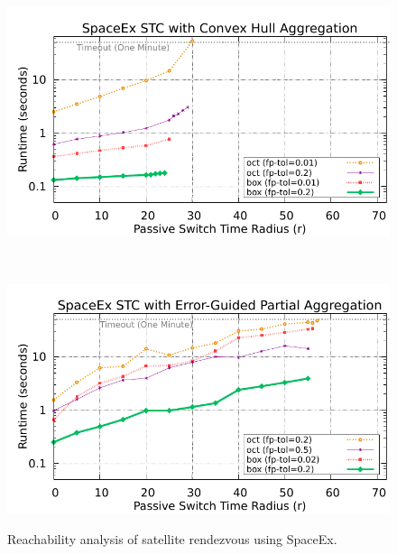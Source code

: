 \begin{figure}
\begin{minipage}{0.48\textwidth}
\begin{minipage}[b]{\linewidth}
\centerline{\includegraphics[width=0.98\columnwidth]{images/chull.pdf}}
\label{fig:spaceex_chull}
\end{minipage}
\\
\begin{minipage}[b]{\linewidth}
\centerline{\includegraphics[width=0.98\columnwidth]{images/unagg.pdf}}
\label{fig:spaceex_unagg}
\end{minipage}
\caption{Reachability analysis of satellite rendezvous using SpaceEx.}
\end{minipage}
\end{figure}



